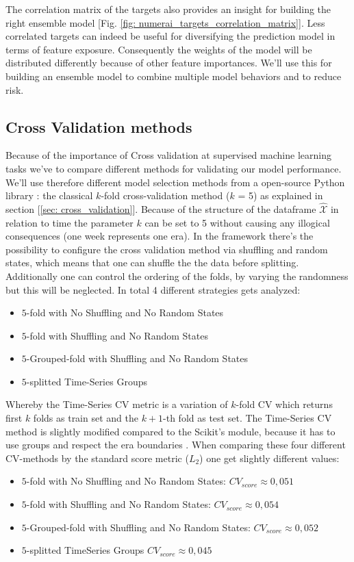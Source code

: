 \documentclass[12pt, a4paper]{article}
\begin{document}
The correlation matrix of the targets also provides an insight for building the right ensemble model [Fig. \ref{fig: numerai_targets_correlation_matrix}]. Less correlated targets can indeed be useful for diversifying the prediction model in terms of feature exposure. Consequently the weights of the model will be distributed differently because of other feature importances. We'll use this for building an ensemble model to combine multiple model behaviors and to reduce risk. \\
\newpage
\subsection{Cross Validation methods}
Because of the importance of Cross validation at supervised machine learning tasks we've to compare different methods for validating our model performance. We'll use therefore different model selection methods from a open-source Python library \cite{Scikit2023}: the classical $k$-fold cross-validation method ($k$ = 5) as explained in section [\ref{sec: cross_validation}]. Because of the structure of the dataframe $\hat{\mathcal{X}}$ in relation to time the parameter $k$ can be set to 5 without causing any illogical consequences (one week represents one era). In the framework there's the possibility to configure the cross validation method via shuffling and random states, which means that one can shuffle the the data before splitting. Additionally one can control the ordering of the folds, by varying the randomness but this will be neglected. In total 4 different strategies gets analyzed:
\begin{itemize}
    \item $5$-fold with No Shuffling and No Random States
    \item $5$-fold with Shuffling and No Random States
    \item $5$-Grouped-fold with Shuffling and No Random States
    \item $5$-splitted Time-Series Groups
\end{itemize}
Whereby the Time-Series CV metric is a variation of $k$-fold CV which returns first $k$ folds as train set and the $k+1$-th fold as test set. The Time-Series CV method is slightly modified compared to the Scikit's module, because it has to use groups and respect the era boundaries \cite{Numerai}. When comparing these four different CV-methods by the standard score metric ($L_2$) one get slightly different values:
\begin{itemize}
    \item $5$-fold with No Shuffling and No Random States: $CV_{score} \approx 0{,}051$
    \item $5$-fold with Shuffling and No Random States: $CV_{score} \approx 0{,}054$
    \item $5$-Grouped-fold with Shuffling and No Random States: $CV_{score} \approx 0{,}052$
    \item $5$-splitted TimeSeries Groups $CV_{score} \approx 0{,}045$
\end{itemize}
\end{document}
